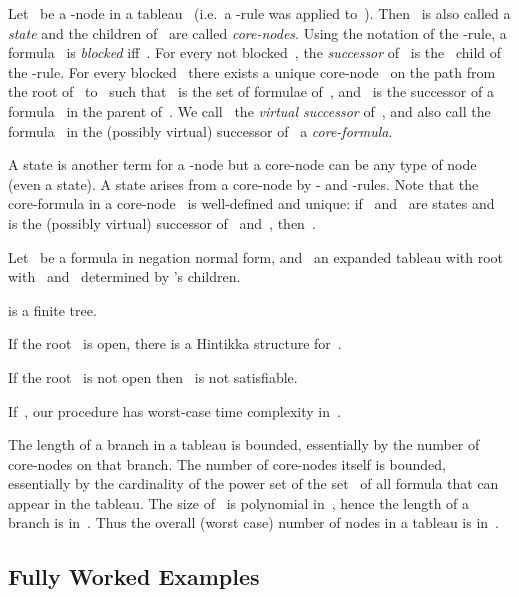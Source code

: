 \documentclass{entcs}
\newcommand{\trea}{}
\begin{document}
\begin{center}
\begin{definition}
  Let~ be a \trea{}-node in a tableau~
  (i.e.\ a \trea{}-rule was applied to~).
  Then~ is also called a \emph{state} and
  the children of~ are called \emph{core-nodes}.
  Using the notation of the \trea{}-rule,
  a formula~ is \emph{blocked} iff~.
  For every not blocked~,
  the \emph{successor} of~ is the ~child of the \trea{}-rule.
  For every blocked~
  there exists a unique core-node~ on the path from the root of~ to~
  such that~ is the set of formulae of~,
  and~ is the successor of a formula~
  in the parent of~.
  We call~ the \emph{virtual successor} of~,
  and also call the formula~ in the (possibly virtual) successor of~
  a \emph{core-formula}.
\end{definition}
A state is another term for a \trea{}-node
but a core-node can be any type of node
(even a state).
A state arises from a core-node
by - and -rules.
Note that the core-formula in a core-node~ is well-defined and unique:
if~ and~ are states
and~ is the (possibly virtual) successor of~ and~,
then~.

Let~ be a formula in negation normal form,
and~ an expanded tableau with root~
with~ and~ determined by 's children.
\begin{theorem}
  \label{thm_term}
   is a finite tree.
\end{theorem}
\begin{theorem}
  \label{theo_correctness}
  If the root~ is open, there is a Hintikka structure for~.
\end{theorem}
\begin{theorem}
  \label{theo_completeness}
  If the root~ is not open then~ is not satisfiable.
\end{theorem}
\begin{theorem}
  \label{theo_complexity}
  If~, our procedure has worst-case time complexity in~.
\end{theorem}
The length of a branch in a tableau is bounded, essentially
by the number of core-nodes on that branch.
The number of core-nodes itself is bounded, essentially
by the cardinality of the power set of the set~ of all formula
that can appear in the tableau.
The size of~ is polynomial in~,
hence the length of a branch is in~.
Thus the overall (worst case) number of nodes in a tableau is in~.


\subsection{Fully Worked Examples}


\end{center}
\end{document}
